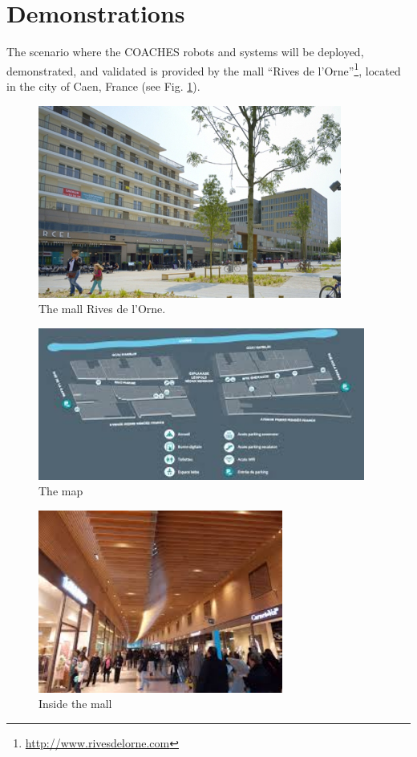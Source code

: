 \section{Demonstrations}
\label{sec:demo}

The scenario where the COACHES robots and systems will be deployed, demonstrated, and validated is provided by the mall ``Rives de l'Orne''\footnote{\url{http://www.rivesdelorne.com}}, located in the city of Caen, France  (see Fig. \ref{fig:outsidemall}).

\begin{figure}[!t]
\begin{center}
\includegraphics[width=0.55\linewidth]{fig/outsiderivesdelorne}
\caption{The mall Rives de l'Orne.}
\label{fig:outsidemall}
\end{center}
\end{figure}

\begin{figure}[htbp]
\begin{center}
\includegraphics[height=5cm]{fig/MapsRorne}
\caption{The map}
\label{fig:map}
\end{center}
\end{figure}

\begin{figure}[htbp]
\begin{center}
\includegraphics[height=6cm]{fig/InsideRivedelOrne}
\caption{Inside the mall}
\label{fig:insidemall}
\end{center}
\end{figure}

